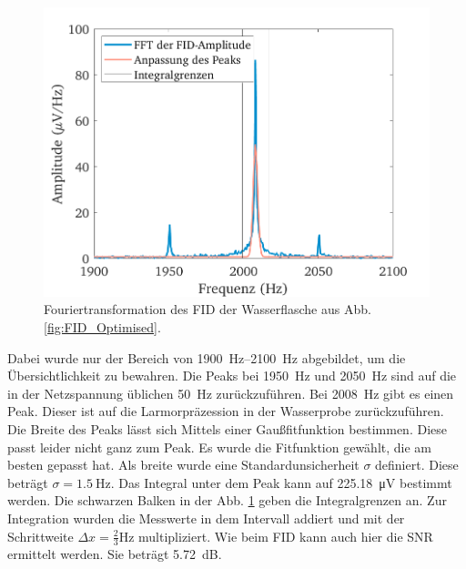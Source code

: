 \documentclass[../main.tex]{subfiles}
\begin{document}
    \begin{figure}[H]
        \centering
        \includegraphics[width=\textwidth]{Bilddateien/7/Part7_Fig_2.png}
        \caption{Fouriertransformation des FID der Wasserflasche aus Abb. \ref{fig:FID_Optimised}.}
        \label{fig:FID_Optimised_FFT}
    \end{figure}
    Dabei wurde nur der Bereich von \SIrange{1900}{2100}{\hertz} abgebildet, um die Übersichtlichkeit zu bewahren. Die Peaks bei \SI{1950}{\hertz} und \SI{2050}{\hertz} sind auf die in der Netzspannung üblichen \SI{50}{\hertz} zurückzuführen. Bei \SI{2008}{\hertz} gibt es einen Peak. Dieser ist auf die Larmorpräzession in der Wasserprobe zurückzuführen. Die Breite des Peaks lässt sich Mittels einer Gaußfitfunktion bestimmen. Diese passt leider nicht ganz zum Peak. Es wurde die Fitfunktion gewählt, die am besten gepasst hat. Als breite wurde eine Standardunsicherheit $\sigma$ definiert. Diese beträgt $\sigma = \SI{1,5}{\hertz}$. Das Integral unter dem Peak kann auf \SI{225,18}{\micro \volt} bestimmt werden. Die schwarzen Balken in der Abb. \ref{fig:FID_Optimised_FFT} geben die Integralgrenzen an. Zur Integration wurden die Messwerte in dem Intervall addiert und mit der Schrittweite $\Delta x = \frac{2}{3}\si{\hertz}$ multipliziert. Wie beim FID kann auch hier die SNR ermittelt werden. Sie beträgt \SI{5,72}{\deci \bel}.
\end{document}
